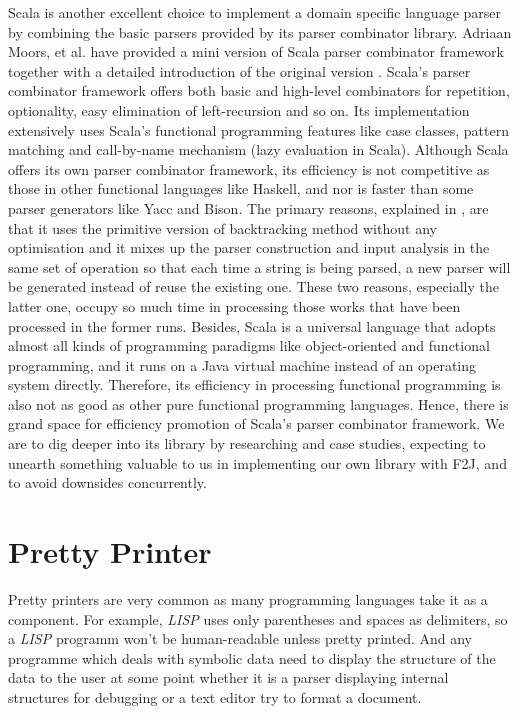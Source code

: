 Scala is another excellent choice to implement a domain specific language parser by combining the basic parsers provided by its parser combinator library. Adriaan Moors, et al. have provided a mini version of Scala parser combinator framework together with a detailed introduction of the original version \cite{Moors:2008}. Scala's parser combinator framework offers both basic and high-level combinators for repetition, optionality, easy elimination of left-recursion and so on. Its implementation extensively uses Scala's functional programming features like case classes, pattern matching and call-by-name mechanism (lazy evaluation in Scala). Although Scala offers its own parser combinator framework, its efficiency is not competitive as those in other functional languages like Haskell, and nor is faster than some parser generators like Yacc and Bison. The primary reasons, explained in \cite{Scala:2008}, are that it uses the primitive version of backtracking method without any optimisation and it mixes up the parser construction and input analysis in the same set of operation so that each time a string is being parsed, a new parser will be generated instead of reuse the existing one. These two reasons, especially the latter one, occupy so much time in processing those works that have been processed in the former runs.  Besides, Scala is a universal language that adopts almost all kinds of programming paradigms like object-oriented and functional programming, and it runs on a Java virtual machine instead of an operating system directly. Therefore, its efficiency in processing functional programming is also not as good as other pure functional programming languages. Hence, there is grand space for efficiency promotion of Scala's parser combinator framework. We are to dig deeper into its library by researching and case studies, expecting to unearth something valuable to us in implementing our own library with F2J, and to avoid downsides concurrently.

\section{Pretty Printer}

Pretty printers are very common as many programming languages take it as a component. For example, \textit{LISP} uses only parentheses and spaces as delimiters, so a \textit{LISP} programm won't be human-readable unless pretty printed. And any programme which deals with symbolic data need to display the structure of the data to the user at some point whether it is a parser displaying internal structures for debugging or a text editor try to format a document.

